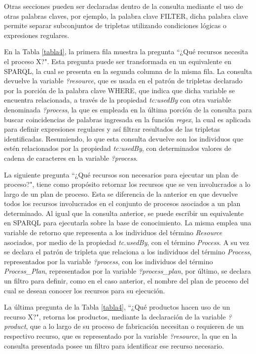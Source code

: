 \documentclass[journal]{IEEEtran}
\begin{document}
Otras secciones pueden ser declaradas dentro de la consulta mediante el uso de otras palabras claves, por ejemplo, la palabra clave FILTER, dicha palabra clave permite separar subconjuntos de tripletas utilizando condiciones l\'ogicas o expresiones regulares. 

En la Tabla \ref{tabla4}, la primera fila muestra la pregunta ``¿Qu\'e recursos necesita el proceso X?". Esta pregunta puede ser transformada en un equivalente en SPARQL, la cual se presenta en la segunda columna de la misma fila. La consulta devuelve la variable \emph{?resource}, que es usada en el patr\'on de tripletas declarado por la porci\'on de la palabra clave WHERE, que indica que dicha variable se encuentra relacionada, a trav\'es de la propiedad \emph{tc:usedBy} con otra variable denominada \emph{?process}, la que es empleada en la \'ultima porci\'on de la consulta para buscar coincidencias de palabras ingresada en la funci\'on \emph{regex}, la cual es aplicada para definir expresiones regulares y as\'i filtrar resultados de las tripletas identificadas. Resumiendo, lo que esta consulta devuelve son los individuos que est\'en relacionados por la propiedad \emph{tc:usedBy}, con determinados valores de cadena de caracteres en la variable \emph{?process}.

La siguiente pregunta ``¿Qu\'e recursos son necesarios para ejecutar un plan de proceso?", tiene como prop\'osito retornar los recursos que se ven involucrados a lo largo de un plan de proceso. Esta se diferencia de la anterior en que devuelve todos los recursos involucrados en el conjunto de procesos asociados a un plan determinado. Al igual que la consulta anterior, se puede escribir un equivalente en SPARQL para ejecutarla sobre la base de conocimiento. La misma emplea una variable de retorno que representa a los individuos del t\'ermino \emph{Resource} asociados, por medio de la propiedad \emph{tc.usedBy}, con el t\'ermino \emph{Process}. A su vez se declara el patr\'on de tripleta que relaciona a los individuos del t\'ermino \emph{Process}, representados por la variable \emph{?process}, con los individuos del t\'ermino \emph{Process\_Plan}, representados por la variable \emph{?process\_plan}, por \'ultimo, se declara un filtro para definir, como en el caso anterior, el nombre del plan de proceso del cual se desean conocer los recursos para su ejecuci\'on.

La \'ultima pregunta de la Tabla \ref{tabla4}, ``¿Qu\'e productos hacen uso de un recurso X?", retorna los productos, mediante la declaraci\'on de la variable \emph{?product}, que a lo largo de su proceso de fabricaci\'on necesitan o requieren de un respectivo recurso, que es representado por la variable \emph{?resource}, la que en la consulta presentada posee un filtro para identificar ese recurso necesario.
\end{document}
